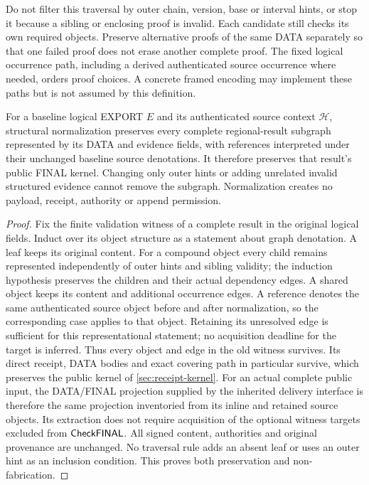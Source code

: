 Do not filter this traversal by outer chain, version, base or interval
hints, or stop it because a sibling or enclosing proof is invalid.
Each candidate still checks its own required objects. Preserve
alternative proofs of the same DATA separately so that one failed
proof does not erase another complete proof. The fixed logical
occurrence path, including a derived authenticated source occurrence
where needed, orders proof choices. A concrete framed encoding may
implement these paths but is not assumed by this definition.

\begin{proposition}
\label{prop:carrier-preservation}
For a baseline logical EXPORT $E$ and its authenticated source context
$\mathcal H$, structural normalization preserves every complete
regional-result subgraph represented by its DATA and evidence fields,
with references interpreted under their unchanged baseline source
denotations. It therefore preserves that result's public FINAL kernel.
Changing only outer hints or adding unrelated invalid structured
evidence cannot remove the subgraph. Normalization creates no payload,
receipt, authority or append permission.
\end{proposition}
\begin{proof}
Fix the finite validation witness of a complete result in the original
logical fields. Induct over its object structure as a statement about
graph denotation. A leaf keeps its original content. For a compound
object every child remains represented independently of outer hints
and sibling validity; the induction hypothesis preserves the children
and their actual dependency edges. A shared object keeps its content
and additional occurrence edges. A reference denotes the same
authenticated source object before and after normalization, so the
corresponding case applies to that object. Retaining its unresolved
edge is sufficient for this representational statement; no acquisition
deadline for the target is inferred.
Thus every object and edge in the old witness survives. Its direct
receipt, DATA bodies and exact covering path in particular survive,
which preserves the public kernel of \cref{sec:receipt-kernel}.
For an actual complete public input, the DATA/FINAL projection supplied
by the inherited delivery interface is therefore the same projection
inventoried from its inline and retained source objects. Its extraction
does not require acquisition of the optional witness targets excluded
from $\mathsf{CheckFINAL}$.
All signed content, authorities and original provenance are unchanged.
No traversal rule adds an absent leaf or uses an outer hint as an
inclusion condition. This proves both preservation and non-fabrication.
\end{proof}

